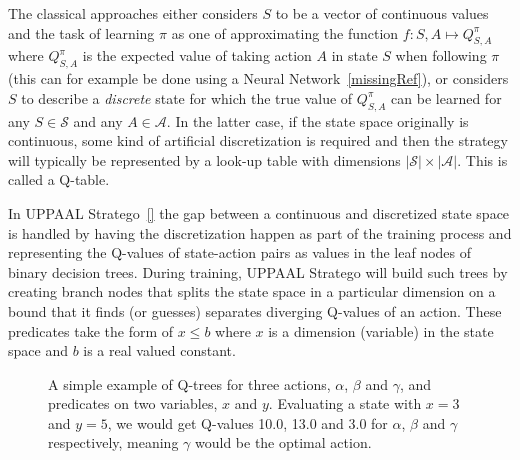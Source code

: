 \documentclass{article}
\begin{document}
The classical approaches either considers $S$ to be a vector of continuous
values and the task of learning $\pi$ as one of approximating the function $f:
S, A \mapsto Q^{\pi}_{S,A}$ where $Q^{\pi}_{S,A}$ is the expected value of
taking action $A$ in state $S$ when following $\pi$ (this can for example be
done using a Neural Network~\ref{missingRef}), or considers $S$ to describe a
\textit{discrete} state for which the true value of $Q^{\pi}_{S,A}$ can be
learned for any $S \in \mathcal{S}$ and any $A \in \mathcal{A}$. In the latter
case, if the state space originally is continuous, some kind of artificial
discretization is required and then the strategy will typically be represented
by a look-up table with dimensions $|\mathcal{S}|\times|\mathcal{A}|$. This is called a Q-table.

In UPPAAL Stratego~\ref{} the gap between a continuous and discretized state
space is handled by having the discretization happen as part of the training
process and representing the Q-values of state-action pairs as values in the
leaf nodes of binary decision trees. During training, UPPAAL Stratego will build
such trees by creating branch nodes that splits the state space in a particular
dimension on a bound that it finds (or guesses) separates diverging Q-values of
an action. These predicates take the form of $x \le b$ where $x$ is a dimension
(variable) in the state space and $b$ is a real valued constant.

\begin{figure}[ht]
    \centering
        \quad
        \quad

    \caption{%
        A simple example of Q-trees for three actions, $\alpha$, $\beta$ and
        $\gamma$, and predicates on two variables, $x$ and $y$. Evaluating a
        state with $x=3$ and $y=5$, we would get Q-values 10.0, 13.0 and 3.0 for
        $\alpha$, $\beta$ and $\gamma$ respectively, meaning $\gamma$ would be
        the optimal action.
    }\label{fig:qTreeExample}
\end{figure}
\end{document}
